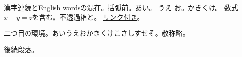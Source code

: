 \documentclass[pdflatex]{jlreq}
\begin{document}
\begin{jlreqparagraph}
漢字連続とEnglish wordsの混在。\inhibitglue 括弧前。あ\hspace{3pt}い。
\kern2pt うえ お。か\allowbreak き\allowbreak く\allowbreak け。
数式$x+y=z$を含む。\mbox{不透過箱}と。
\hyperref[par:target]{リンク付き}\label{par:target}。
\end{jlreqparagraph}
\begin{jlreqparagraph}
二つ目の環境。あいうえおかきくけこさしすせそ。敬称略。
\end{jlreqparagraph}
後続段落。
\makeatletter
{}
\makeatother
\end{document}
